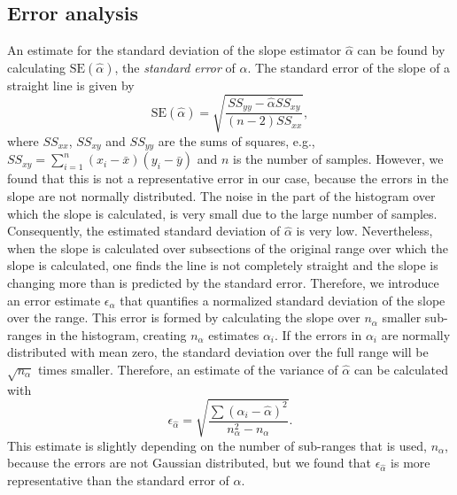 \documentclass[useAMS,usenatbib]{mn2e}
\begin{document}
\subsection{Error analysis}
An estimate for the standard deviation of the slope estimator $\hat \alpha$ can be found by calculating $\textrm{SE}(\hat \alpha)$, the \emph{standard error} of $\hat \alpha$. The standard error of the slope of a straight line \citep[pp. 32--35]{acton-analaysis-of-straight-lines} is given by
\begin{equation} \label{eq:stderr-slope}
 \textrm{SE}(\hat \alpha) = \sqrt{\frac{SS_{yy}-\hat\alpha SS_{xy}}{\left(n - 2\right) SS_{xx}}},
\end{equation}
where $SS_{xx}$, $SS_{xy}$ and $SS_{yy}$ are the sums of squares, e.g., $SS_{xy}=\sum_{i=1}^n (x_i - \bar x) (y_i - \bar y)$ and $n$ is the number of samples. However, we found that this is not a representative error in our case, because the errors in the slope are not normally distributed. The noise in the part of the histogram over which the slope is calculated, is very small due to the large number of samples. Consequently, the estimated standard deviation of $\hat \alpha$ is very low. Nevertheless, when the slope is calculated over subsections of the original range over which the slope is calculated, one finds the line is not completely straight and the slope is changing more than is predicted by the standard error. Therefore, we introduce an error estimate $\epsilon_\alpha$ that quantifies a normalized standard deviation of the slope over the range. This error is formed by calculating the slope over $n_\alpha$ smaller sub-ranges in the histogram, creating $n_\alpha$ estimates $\alpha_i$. If the errors in $\alpha_i$ are normally distributed with mean zero, the standard deviation over the full range will be $\sqrt{n_\alpha}$ times smaller. Therefore, an estimate of the variance of $\hat \alpha$ can be calculated with
\begin{equation}
 \epsilon_{\hat\alpha} = \sqrt{\frac{\sum \left( \alpha_i - \hat\alpha \right)^2 }{n^2_\alpha - n_\alpha}}.
\end{equation}
This estimate is slightly depending on the number of sub-ranges that is used, $n_\alpha$, because the errors are not Gaussian distributed, but we found that $\epsilon_{\hat\alpha}$ is more representative than the standard error of $\hat\alpha$. 
\end{document}
